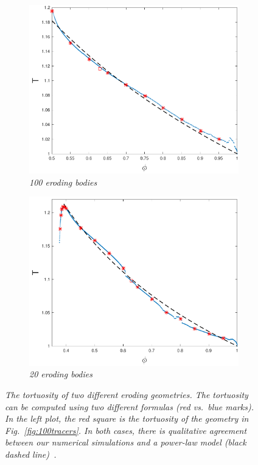 \documentclass[11pt]{article}
\begin{document}
\begin{figure}[htp]
  \begin{center}
  \begin{subfigure}[b]{0.45\textwidth}
  \includegraphics[width=\textwidth]{figs/tort_eulerian100}
  \caption{\em 100 eroding bodies}
  \end{subfigure}
  \begin{subfigure}[b]{0.45\textwidth}
  \includegraphics[width=\textwidth]{figs/tort_eulerian20}
  \caption{\em 20 eroding bodies}
  \end{subfigure}
  \end{center}
  \caption{\label{fig:100tortuosity} \em The tortuosity of two different eroding geometries. The tortuosity can be computed using two different formulas (red vs.~blue marks). In the left plot, the red square is the tortuosity of the geometry in Fig.~\ref{fig:100tracers}. In both cases, there is qualitative agreement between our numerical simulations and a power-law model (black dashed line)~\cite{mat-kha-koz2008}.}
\end{figure}
\end{document}
